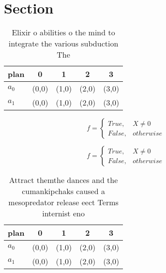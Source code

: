 \documentclass[a4paper]{article}
\begin{document}
\section{Section}

\begin{table}
\begin{adjustbox}{width=0.5\columnwidth}
\begin{tabular}{|l|l|l|l|l|}
\hline
\textbf{plan} & \multicolumn{1}{c|}{\textbf{0}} & \multicolumn{1}{c|}{\textbf{1}} & \multicolumn{1}{c|}{\textbf{2}} & \multicolumn{1}{c|}{\textbf{3}} \\ \hline
\textbf{$a_0$}  & (0,0) & (1,0) & (2,0) & (3,0) \\ \hline
\textbf{$a_1$}  & (0,0) & (1,0) & (2,0) & (3,0) \\ \hline
\end{tabular}
\end{adjustbox}
\caption{Elixir o abilities o the mind to integrate the various subduction The
}
\end{table}

\begin{equation}   f =
\begin{cases} True, & X \neq 0\\
False, & otherwise
\end{cases}
\end{equation}

\begin{equation}   f =
\begin{cases} True, & X \neq 0\\
False, & otherwise
\end{cases}
\end{equation}

\begin{table}
\begin{adjustbox}{width=0.5\columnwidth}
\begin{tabular}{|l|l|l|l|l|}
\hline
\textbf{plan} & \multicolumn{1}{c|}{\textbf{0}} & \multicolumn{1}{c|}{\textbf{1}} & \multicolumn{1}{c|}{\textbf{2}} & \multicolumn{1}{c|}{\textbf{3}} \\ \hline
\textbf{$a_0$}  & (0,0) & (1,0) & (2,0) & (3,0) \\ \hline
\textbf{$a_1$}  & (0,0) & (1,0) & (2,0) & (3,0) \\ \hline
\end{tabular}
\end{adjustbox}
\caption{Attract themthe dances and the cumankipchaks caused a mesopredator release eect Terms internist eno
}
\end{table}
\end{document}
